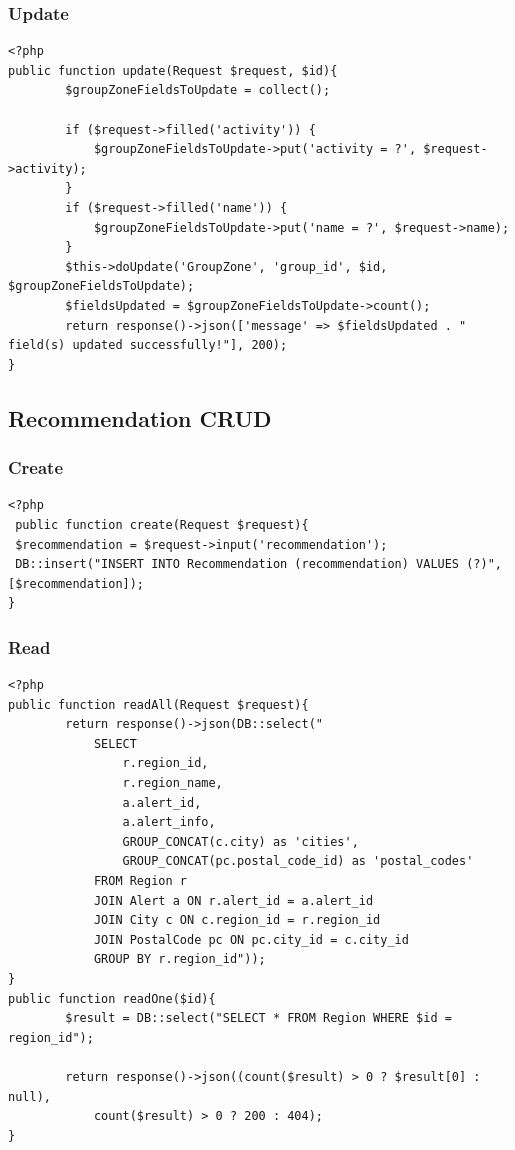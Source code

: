 \subsubsection{Update}
\begin{verbatim}
<?php
public function update(Request $request, $id){
        $groupZoneFieldsToUpdate = collect();
        
        if ($request->filled('activity')) {
            $groupZoneFieldsToUpdate->put('activity = ?', $request->activity);
        }
        if ($request->filled('name')) {
            $groupZoneFieldsToUpdate->put('name = ?', $request->name);
        }
        $this->doUpdate('GroupZone', 'group_id', $id, $groupZoneFieldsToUpdate);
        $fieldsUpdated = $groupZoneFieldsToUpdate->count();
        return response()->json(['message' => $fieldsUpdated . " field(s) updated successfully!"], 200);
}
\end{verbatim}
\subsection{Recommendation CRUD}
\subsubsection{Create}
\begin{verbatim}
<?php
 public function create(Request $request){
 $recommendation = $request->input('recommendation');
 DB::insert("INSERT INTO Recommendation (recommendation) VALUES (?)", [$recommendation]);
}
\end{verbatim}
\subsubsection{Read}
\begin{verbatim}
<?php
public function readAll(Request $request){
        return response()->json(DB::select("
            SELECT
                r.region_id,
                r.region_name,
                a.alert_id,
                a.alert_info,
                GROUP_CONCAT(c.city) as 'cities',
                GROUP_CONCAT(pc.postal_code_id) as 'postal_codes'
            FROM Region r
            JOIN Alert a ON r.alert_id = a.alert_id
            JOIN City c ON c.region_id = r.region_id
            JOIN PostalCode pc ON pc.city_id = c.city_id
            GROUP BY r.region_id"));
}
public function readOne($id){
        $result = DB::select("SELECT * FROM Region WHERE $id = region_id");

        return response()->json((count($result) > 0 ? $result[0] : null),
            count($result) > 0 ? 200 : 404);
}

\end{verbatim}
